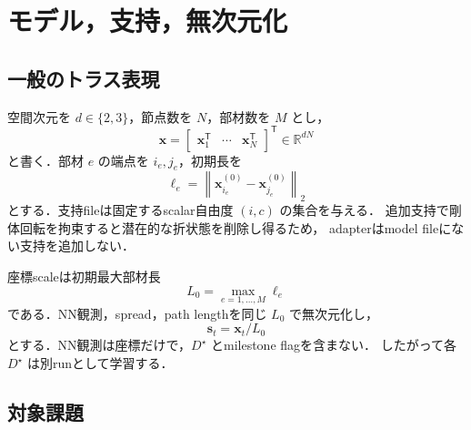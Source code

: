 \documentclass[a4paper,11pt]{ltjsarticle}
\newcommand{\R}{\mathbb{R}}
\newcommand{\norm}[1]{\left\lVert #1\right\rVert}
\begin{document}
\section{モデル，支持，無次元化}
\label{sec:model}

\subsection{一般のトラス表現}

空間次元を $d\in\{2,3\}$，節点数を $N$，部材数を $M$ とし，
\begin{equation}
 \bm x=
 \begin{bmatrix}
  \bm x_1^\mathsf T&\cdots&\bm x_N^\mathsf T
 \end{bmatrix}^{\mathsf T}
 \in\R^{dN}
\end{equation}
と書く．部材 $e$ の端点を $i_e,j_e$，初期長を
\begin{equation}
 \ell_e=\norm{\bm x_{i_e}^{(0)}-\bm x_{j_e}^{(0)}}_2
\end{equation}
とする．支持fileは固定するscalar自由度 $(i,c)$ の集合を与える．
追加支持で剛体回転を拘束すると潜在的な折状態を削除し得るため，
adapterはmodel fileにない支持を追加しない．

座標scaleは初期最大部材長
\begin{equation}
 L_0=\max_{e=1,\ldots,M}\ell_e
\end{equation}
である．NN観測，spread，path lengthを同じ $L_0$ で無次元化し，
\begin{equation}
 \bm s_t=\bm x_t/L_0
\end{equation}
とする．NN観測は座標だけで，$D^\star$ とmilestone flagを含まない．
したがって各 $D^\star$ は別runとして学習する．

\subsection{対象課題}
\end{document}
